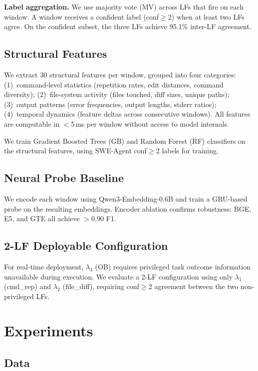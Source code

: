 \documentclass[11pt,a4paper]{article}
\begin{document}
\textbf{Label aggregation.} We use majority vote (MV) across LFs that fire on each window. A window receives a confident label (conf$\geq$2) when at least two LFs agree.
On the confident subset, the three LFs achieve 95.1\% inter-LF agreement.

\subsection{Structural Features}

We extract 30 structural features per window, grouped into four categories: (1)~command-level statistics (repetition rates, edit distances, command diversity); (2)~file-system activity (files touched, diff sizes, unique paths); (3)~output patterns (error frequencies, output lengths, stderr ratios); (4)~temporal dynamics (feature deltas across consecutive windows).
All features are computable in $<$5\,ms per window without access to model internals.

We train Gradient Boosted Trees (GB) and Random Forest (RF) classifiers on the structural features, using SWE-Agent conf$\geq$2 labels for training.

\subsection{Neural Probe Baseline}

We encode each window using Qwen3-Embedding-0.6B and train a GRU-based probe on the resulting embeddings. Encoder ablation confirms robustness: BGE, E5, and GTE all achieve $>$0.90 F1.

\subsection{2-LF Deployable Configuration}

For real-time deployment, $\lambda_3$ (OB) requires privileged task outcome information unavailable during execution.
We evaluate a 2-LF configuration using only $\lambda_1$ (cmd\_rep) and $\lambda_2$ (file\_diff), requiring conf$\geq$2 agreement between the two non-privileged LFs.

\section{Experiments}
\label{sec:experiments}

\subsection{Data}
\end{document}
